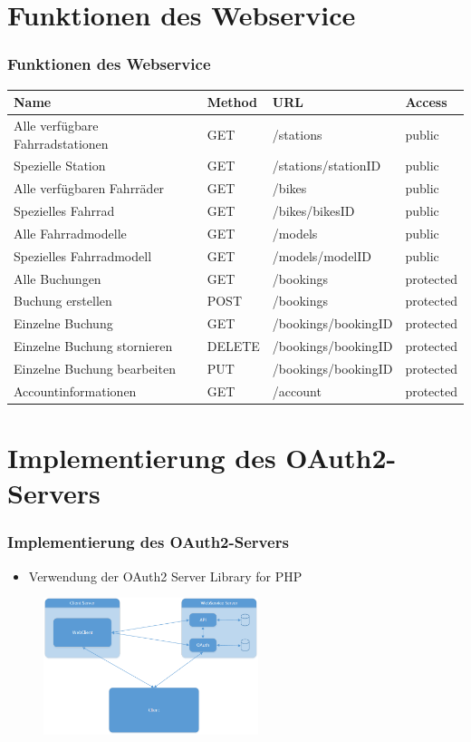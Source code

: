 \section{Funktionen des Webservice}
\begin{frame}
	\frametitle*{Funktionen des Webservice}
		\begin{tabularx}{\columnwidth}{|X|p{1cm}|p{2.5cm}|p{1.5cm}|}
		\hline
		Name & Method & URL & Access \\
		\hline
		\hline
		Alle verfügbare Fahrradstationen & GET & /stations & public \\
		\hline
		Spezielle Station & GET & /stations/stationID & public \\
		\hline
		Alle verfügbaren Fahrräder & GET & /bikes & public \\
		\hline
		Spezielles Fahrrad & GET & /bikes/bikesID & public \\
		\hline
		Alle Fahrradmodelle & GET & /models & public \\
		\hline
		Spezielles Fahrradmodell & GET & /models/modelID & public \\
		\hline
		Alle Buchungen & GET & /bookings & protected \\
		\hline
		Buchung erstellen & POST & /bookings & protected \\
		\hline
		Einzelne Buchung & GET & /bookings/bookingID & protected \\
		\hline
		Einzelne Buchung stornieren & DELETE & /bookings/bookingID & protected \\
		\hline
		Einzelne Buchung bearbeiten & PUT & /bookings/bookingID & protected \\
		\hline
		Accountinformationen & GET & /account & protected \\
		\hline
	\end{tabularx}
\end{frame}

\section{Implementierung des OAuth2-Servers}
\begin{frame}
	\frametitle*{Implementierung des OAuth2-Servers}
	\begin{itemize}
		\item Verwendung der \glqq OAuth2 Server Library for PHP\grqq
	\end{itemize}
	\begin{figure}
		\centering
		\includegraphics[height=40mm]{pics/Architektur.png}
	\end{figure}
\end{frame}

